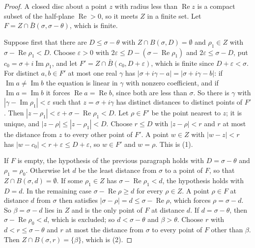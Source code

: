 \begin{proof}
A closed disc about a point $z$ with radius less than $\operatorname{Re}z$ is
a compact subset of the half-plane $\operatorname{Re}>0$, so it meets $Z$ in
a finite set. Let $F=Z\cap\bar B(\sigma,\sigma-\theta)$, which is finite.

Suppose first that there are $D\leq\sigma-\theta$ with
$Z\cap B(\sigma,D)=\emptyset$ and $\rho_1\in Z$ with
$\sigma-\operatorname{Re}\rho_1<D$. Choose $\varepsilon>0$ with
$2\varepsilon\leq D-(\sigma-\operatorname{Re}\rho_1)$ and
$2\varepsilon\leq\sigma-D$, put $c_0=\sigma+i\operatorname{Im}\rho_1$, and let
$F'=Z\cap\bar B(c_0,D+\varepsilon)$, which is finite since
$D+\varepsilon<\sigma$. For distinct $a,b\in F'$ at most one real $\gamma$
has $|\sigma+i\gamma-a|=|\sigma+i\gamma-b|$: if
$\operatorname{Im}a\neq\operatorname{Im}b$ the equation is linear in $\gamma$
with nonzero coefficient, and if $\operatorname{Im}a=\operatorname{Im}b$ it
forces $\operatorname{Re}a=\operatorname{Re}b$, since both are less than
$\sigma$. So there is $\gamma$ with $|\gamma-\operatorname{Im}\rho_1|<\varepsilon$
such that $z=\sigma+i\gamma$ has distinct distances to distinct points of
$F'$. Then $|z-\rho_1|<\varepsilon+\sigma-\operatorname{Re}\rho_1<D$. Let
$\rho\in F'$ be the point nearest to $z$; it is unique, and
$|z-\rho|\leq|z-\rho_1|<D$. Choose $r\leq D$ with $|z-\rho|<r$ and $r$ at most
the distance from $z$ to every other point of $F'$. A point $w\in Z$ with
$|w-z|<r$ has $|w-c_0|<r+\varepsilon\leq D+\varepsilon$, so $w\in F'$ and
$w=\rho$. This is (1).

If $F$ is empty, the hypothesis of the previous paragraph holds with
$D=\sigma-\theta$ and $\rho_1=\rho_0$. Otherwise let $d$ be the least
distance from $\sigma$ to a point of $F$, so that $Z\cap B(\sigma,d)=\emptyset$.
If some $\rho_1\in Z$ has $\sigma-\operatorname{Re}\rho_1<d$, the hypothesis
holds with $D=d$. In the remaining case $\sigma-\operatorname{Re}\rho\geq d$
for every $\rho\in Z$. A point $\rho\in F$ at distance $d$ from $\sigma$ then
satisfies $|\sigma-\rho|=d\leq\sigma-\operatorname{Re}\rho$, which forces
$\rho=\sigma-d$. So $\beta=\sigma-d$ lies in $Z$ and is the only point of $F$
at distance $d$. If $d=\sigma-\theta$, then
$\sigma-\operatorname{Re}\rho_0<d$, which is excluded; so $d<\sigma-\theta$
and $\beta>\theta$. Choose $r$ with $d<r\leq\sigma-\theta$ and $r$ at most the
distance from $\sigma$ to every point of $F$ other than $\beta$. Then
$Z\cap B(\sigma,r)=\{\beta\}$, which is (2).
\end{proof}


